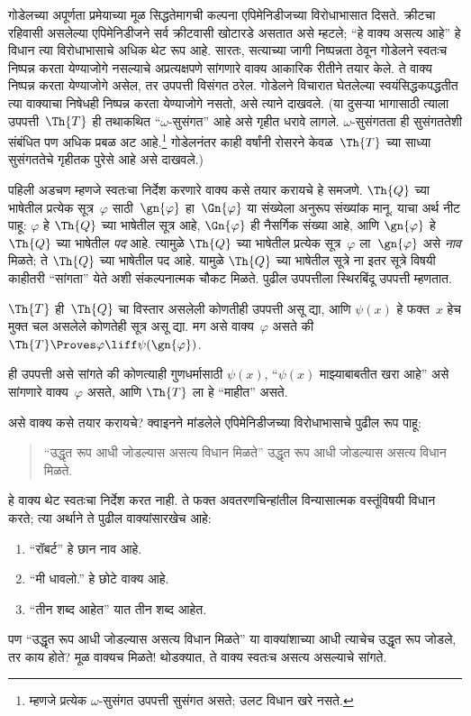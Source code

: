 गोडेलच्या अपूर्णता प्रमेयाच्या मूळ सिद्धतेमागची कल्पना
एपिमेनिडीजच्या विरोधाभासात दिसते. क्रीटचा रहिवासी असलेल्या
एपिमेनिडीजने सर्व क्रीटवासी खोटारडे असतात असे म्हटले;
“हे वाक्य असत्य आहे” हे विधान त्या विरोधाभासाचे अधिक थेट
रूप आहे. सारतः, सत्याच्या जागी निष्पन्नता ठेवून गोडेलने
स्वतःच निष्पन्न करता येण्याजोगे नसल्याचे अप्रत्यक्षपणे सांगणारे
वाक्य आकारिक रीतीने तयार केले. ते वाक्य
निष्पन्न करता येण्याजोगे असेल, तर उपपत्ती विसंगत ठरेल. गोडेलने
विचारात घेतलेल्या स्वयंसिद्धकपद्धतीत त्या वाक्याचा
निषेधही निष्पन्न करता येण्याजोगे नसतो, असे त्याने दाखवले. (या दुसऱ्या
भागासाठी त्याला उपपत्ती~$\Th{T}$ ही तथाकथित
“$\omega$-सुसंगत” आहे असे गृहीत धरावे लागले.
$\omega$-सुसंगतता ही सुसंगततेशी संबंधित पण अधिक प्रबळ अट
आहे.\footnote{म्हणजे प्रत्येक $\omega$-सुसंगत उपपत्ती
सुसंगत असते; उलट विधान खरे नसते.} गोडेलनंतर काही वर्षांनी
रोसरने केवळ~$\Th{T}$ च्या साध्या सुसंगततेचे गृहीतक पुरेसे
आहे असे दाखवले.)

पहिली अडचण म्हणजे स्वतःचा निर्देश करणारे वाक्य
कसे तयार करायचे हे समजणे. $\Th{Q}$ च्या भाषेतील प्रत्येक
सूत्र~$\varphi$ साठी~$\gn{\varphi}$ हा~$\Gn{\varphi}$ या संख्येला
अनुरूप संख्यांक मानू. याचा अर्थ नीट पाहू: $\varphi$ हे
$\Th{Q}$ च्या भाषेतील सूत्र आहे, $\Gn{\varphi}$ ही
नैसर्गिक संख्या आहे, आणि $\gn{\varphi}$ हे $\Th{Q}$ च्या
भाषेतील \emph{पद} आहे. त्यामुळे $\Th{Q}$ च्या भाषेतील
प्रत्येक सूत्र~$\varphi$ ला~$\gn{\varphi}$ असे \emph{नाव}
मिळते; ते $\Th{Q}$ च्या भाषेतील पद आहे. यामुळे
$\Th{Q}$ च्या भाषेतील सूत्रे ना
इतर सूत्रे विषयी काहीतरी “सांगता” येते अशी
संकल्पनात्मक चौकट मिळते. पुढील उपपत्तीला स्थिरबिंदू
उपपत्ती म्हणतात.

\begin{lem}
$\Th{T}$ ही~$\Th{Q}$ चा विस्तार असलेली कोणतीही उपपत्ती
असू द्या, आणि $\psi(x)$ हे फक्त~$x$ हेच मुक्त चल असलेले
कोणतेही सूत्र असू द्या. मग असे
वाक्य~$\varphi$ असते की
$\Th{T} \Proves\varphi \liff \psi(\gn{\varphi})$.
\end{lem}

ही उपपत्ती असे सांगते की कोणत्याही गुणधर्मासाठी $\psi(x)$,
“$\psi(x)$ माझ्याबाबतीत खरा आहे” असे सांगणारे
वाक्य~$\varphi$ असते, आणि $\Th{T}$ ला हे
“माहीत” असते.

असे वाक्य कसे तयार करायचे? क्वाइनने मांडलेले
एपिमेनिडीजच्या विरोधाभासाचे पुढील रूप पाहू:
\begin{quote}
“उद्धृत रूप आधी जोडल्यास असत्य विधान मिळते” उद्धृत रूप
आधी जोडल्यास असत्य विधान मिळते.
\end{quote}
हे वाक्य थेट स्वतःचा निर्देश करत नाही. ते फक्त अवतरणचिन्हांतील
विन्यासात्मक वस्तूंविषयी विधान करते; त्या अर्थाने ते
पुढील वाक्यांसारखेच आहे:
\begin{enumerate}
\item “रॉबर्ट” हे छान नाव आहे.
\item “मी धावलो.” हे छोटे वाक्य आहे.
\item “तीन शब्द आहेत” यात तीन शब्द आहेत.
\end{enumerate}
पण “उद्धृत रूप आधी जोडल्यास असत्य विधान मिळते” या
वाक्यांशाच्या आधी त्याचेच उद्धृत रूप जोडले, तर काय होते?
मूळ वाक्यच मिळते!{} थोडक्यात, ते वाक्य स्वतःच असत्य
असल्याचे सांगते.













